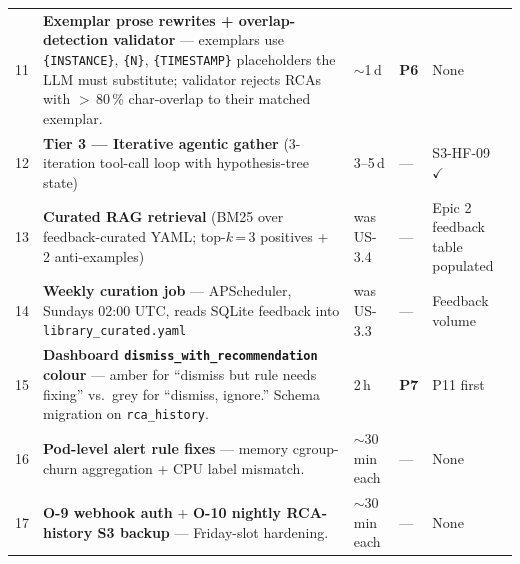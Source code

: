 \documentclass[11pt,a4paper,oneside]{report}
\begin{document}
\begin{longtable}{rp{} p{} p{} p{}}
11 & \textbf{Exemplar prose rewrites + overlap-detection
     validator} --- exemplars use \texttt{\{INSTANCE\}},
     \texttt{\{N\}}, \texttt{\{TIMESTAMP\}} placeholders the LLM
     must substitute; validator rejects RCAs with $>$\,80\,\%
     char-overlap to their matched exemplar.
                                              & $\sim$1\,d
                                              & \textbf{P6}
                                              & None \\
12 & \textbf{Tier 3 --- Iterative agentic gather} (3-iteration
     tool-call loop with hypothesis-tree state)
                                              & 3--5\,d
                                              & ---
                                              & S3-HF-09 $\checkmark$ \\
13 & \textbf{Curated RAG retrieval} (BM25 over feedback-curated
     YAML; top-$k$\,=\,3 positives + 2 anti-examples)
                                              & was US-3.4
                                              & ---
                                              & Epic 2 feedback table populated \\
14 & \textbf{Weekly curation job} --- APScheduler, Sundays 02:00
     UTC, reads SQLite feedback into \texttt{library\_curated.yaml}
                                              & was US-3.3
                                              & ---
                                              & Feedback volume \\
15 & \textbf{Dashboard \texttt{dismiss\_with\_recommendation}
     colour} --- amber for ``dismiss but rule needs fixing'' vs.\
     grey for ``dismiss, ignore.''  Schema migration on
     \texttt{rca\_history}.
                                              & 2\,h
                                              & \textbf{P7}
                                              & P11 first \\
16 & \textbf{Pod-level alert rule fixes} --- memory cgroup-churn
     aggregation + CPU label mismatch.
                                              & $\sim$30\,min each
                                              & ---
                                              & None \\
17 & \textbf{O-9 webhook auth} + \textbf{O-10 nightly RCA-history
     S3 backup} --- Friday-slot hardening.
                                              & $\sim$30\,min each
                                              & ---
                                              & None \\

\end{longtable}
\end{document}
